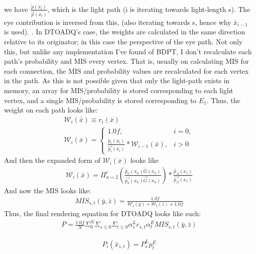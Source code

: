 \message{ !name(test.tex)}\documentclass{article}
\begin{document}
we have $\frac{\overleftarrow{p}(\bar{x}_i)}{\overrightarrow{p}(\bar{x}_i)}$,
which is the light path (i is iterating towards light-length s). The eye
contribution is inversed from this, (also iterating towards s, hence why
$\bar{x}_{i-1}$ is used). . In DTOADQ's case, the weights are calculated in the
same direction relative to its originator; in this case the perspective of the
eye path. Not only this, but unlike any implementation I've found of BDPT, I
don't recalculate each path's probability and MIS every vertex. That is, usually
on calculating MIS for each connection, the MIS and probability values are
recalculated for each vertex in the path. As this is not possible given that
only the light-path exists in memory, an array for MIS/probability is stored
corresponding to each light vertex, and a single MIS/probability is stored
corresponding to $E_1$. Thus, the weight on each path looks like:
  \begin{align}
    \mathcal{W}_i(\bar{x}) \equiv r_i(\bar{x})\\
    \mathcal{W}_i (\bar{x}) = 
    \begin{cases}
      1.0f, & i = 0,\\
      \frac{\overleftarrow{p_i}(\bar{x_i})}{\overrightarrow{p_i}(\bar{x_i})} *
      \mathcal{W}_{i-1}(\bar{x}), & i > 0
    \end{cases}
  \end{align}
    And then the expanded form of $\mathcal{W}_i(\bar{x})$ looks like
  \begin{align}
    \mathcal{W}_i(\bar{x}) = \Pi_{n=2}^i(\frac{\overleftarrow
    {p_{\sigma}}(x_n)\overleftarrow {G}(x_n)}
    {\overrightarrow{p_{\sigma}}(x_n)\overrightarrow{G}(x_n)})
    * \frac{\overleftarrow{p_A}(x_1)}{\overrightarrow{p_A}(x_1)}
  \end{align}
    And now the MIS looks like:
  \begin{align}
    MIS_{s, t}(\bar{y}, \bar{z}) =
    \frac{1.0f}{\mathcal{W}_s(\bar{y}) + \mathcal{W}_t(\bar{z}) + 1.0f}
  \end{align}
    Thus, the final rendering equation for DTOADQ looks like such:
  \begin{align}
    P = \frac{1.0f}{N} \Sigma_{0}^{N} \Sigma_{s \le 0} \Sigma_{t \le 0}
    \alpha^L_s c_{s,t} \alpha^E_t MIS_{s, t}(\bar{y}, \bar{z})
  \end{align}


  \begin{align}
    P_i(\bar{x}_{s, t}) = P^L_s p^E_t
  \end{align}
\end{document}
